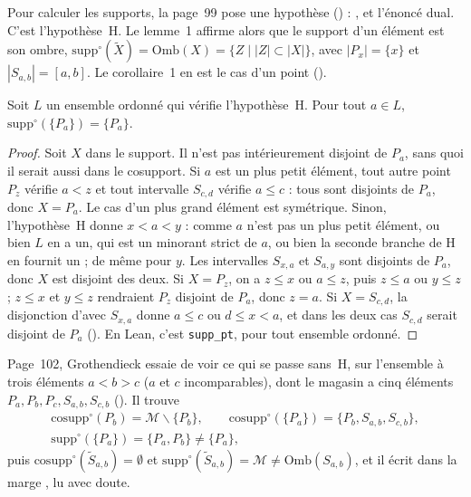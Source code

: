 Pour calculer les supports, la page~99 pose une hypothèse () :
, et l'énoncé dual. C'est l'hypothèse~H. Le lemme~1 affirme alors que le support d'un élément est son ombre, $\mathrm{supp}^\circ(\widetilde X) = \mathrm{Omb}(X) = \{Z \mid |Z| \subset |X|\}$, avec $|P_x| = \{x\}$ et $|S_{a,b}| = [a,b]$. Le corollaire~1 en est le cas d'un point ().

\begin{encadre}
\begin{theoreme}
Soit $L$ un ensemble ordonné qui vérifie l'hypothèse~H. Pour tout $a \in L$, $\mathrm{supp}^\circ(\{P_a\}) = \{P_a\}$.
\end{theoreme}
\end{encadre}

\begin{proof}
Soit $X$ dans le support. Il n'est pas intérieurement disjoint de $P_a$, sans quoi il serait aussi dans le cosupport. Si $a$ est un plus petit élément, tout autre point $P_z$ vérifie $a < z$ et tout intervalle $S_{c,d}$ vérifie $a \leq c$ : tous sont disjoints de $P_a$, donc $X = P_a$. Le cas d'un plus grand élément est symétrique. Sinon, l'hypothèse~H donne $x < a < y$ : comme $a$ n'est pas un plus petit élément, ou bien $L$ en a un, qui est un minorant strict de $a$, ou bien la seconde branche de H en fournit un ; de même pour $y$. Les intervalles $S_{x,a}$ et $S_{a,y}$ sont disjoints de $P_a$, donc $X$ est disjoint des deux. Si $X = P_z$, on a $z \leq x$ ou $a \leq z$, puis $z \leq a$ ou $y \leq z$ ; $z \leq x$ et $y \leq z$ rendraient $P_z$ disjoint de $P_a$, donc $z = a$. Si $X = S_{c,d}$, la disjonction d'avec $S_{x,a}$ donne $a \leq c$ ou $d \leq x < a$, et dans les deux cas $S_{c,d}$ serait disjoint de $P_a$ (). En Lean, c'est \texttt{supp\_pt}, pour tout ensemble ordonné.
\end{proof}

Page~102, Grothendieck essaie de voir ce qui se passe sans~H, sur l'ensemble à trois éléments $a < b > c$ ($a$ et $c$ incomparables), dont le magasin a cinq éléments $P_a, P_b, P_c, S_{a,b}, S_{c,b}$ (). Il trouve
\begin{gather*}
\mathrm{cosupp}^\circ(P_b) = \mathcal M \smallsetminus \{P_b\}, \qquad
\mathrm{cosupp}^\circ(\{P_a\}) = \{P_b, S_{a,b}, S_{c,b}\}, \\
\mathrm{supp}^\circ(\{P_a\}) = \{P_a, P_b\} \neq \{P_a\},
\end{gather*}
puis $\mathrm{cosupp}^\circ(\widetilde S_{a,b}) = \emptyset$ et $\mathrm{supp}^\circ(\widetilde S_{a,b}) = \mathcal M \neq \mathrm{Omb}(S_{a,b})$, et il écrit dans la marge , lu avec doute.

